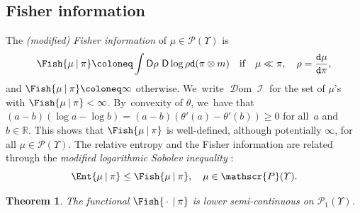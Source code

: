 \documentclass[JEP,XML,SOM,Unicode,published]{cedram}
\newcommand{\real}{\mathbb{R}}
\newtheorem{theorem}{Theorem}[section]
\theoremstyle{definition}
\theoremstyle{remark}
\newcommand{\given}[1][]{%
\nonscript\:#1\vert
\allowbreak
\nonscript\:
\mathopen{}}
\DeclareMathOperator{\fish}{\mathcal{I}}
\DeclareMathOperator{\dom}{\mathscr{D}om}
\newcommand{\emparg}{\,\cdot\,}
\begin{document}
\subsection{Fisher information}
The \emph{(modified) Fisher information} of $\mu \in \mathscr{P}(\varUpsilon)$ is
\begin{equation*}
\Fish{\mu \given \pi} \coloneq \int \mathsf{D} \rho \ \mathsf{D} \log \rho \mathtt{d} (\pi \otimes m) \quad \text{if} \quad \mu\ll \pi , \quad \rho= \frac{\mathtt{d} \mu}{\mathtt{d} \pi},
\end{equation*}
and $\Fish{\mu \given \pi} \coloneq \infty$ otherwise. We~write $\dom \fish$ for the set of $\mu$'s with $\Fish{\mu \given \pi} < \infty$.
By~convexity of $\theta$, we~have that $(a - b) (\log a - \log b) = (a-b) (\theta'(a) - \theta'(b)) \geq 0$ for all~$a$ and~$b \in \real$.
This shows that $\Fish{\mu \given \pi}$ is well-defined, although potentially $\infty$, for all $\mu \in \mathscr{P}(\varUpsilon)$.
The relative entropy and the Fisher information are related through the \emph{modified logarithmic Sobolev inequality} \cite[Cor.\,2.2]{Wu}:
\begin{equation}\label{e:lsi}
\Ent{\mu \given \pi} \leq \Fish{\mu \given \pi}, \quad \mu \in \mathscr{P}(\varUpsilon).
\end{equation}

\begin{theorem}\label{t:lsc-I}
The functional $\Fish{\emparg \given \pi}$ is lower semi-continuous on $\mathscr{P}_{1}(\varUpsilon)$.
\end{theorem}
\end{document}

